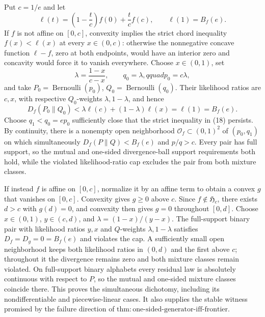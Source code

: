 Put \(c=1/e\) and let
\[
 \ell(t)=\left(1-\frac tc\right)f(0)+\frac tc f(c),
 \qquad \ell(1)=B_f(e).
\]
If \(f\) is not affine on \([0,c]\), convexity implies the strict chord inequality \(f(x)<\ell(x)\) at every \(x\in(0,c)\): otherwise the nonnegative concave function \(\ell-f\), zero at both endpoints, would have an interior zero and concavity would force it to vanish everywhere.  Choose \(x\in(0,1)\), set
\[
 \lambda=\frac{1-x}{c-x},\qquad q_0=\lambda,qquad p_0=c\lambda,
\]
and take \(P_0=\operatorname{Bernoulli}(p_0)\), \(Q_0=\operatorname{Bernoulli}(q_0)\).  Their likelihood ratios are \(c,x\), with respective \(Q_0\)-weights \(\lambda,1-\lambda\), and hence
\[
 D_f(P_0\|Q_0)<\lambda\ell(c)+(1-\lambda)\ell(x)=\ell(1)=B_f(e). \tag{18}
\]
Choose \(q_1<q_0=ep_0\) sufficiently close that the strict inequality in (18) persists.  By continuity, there is a nonempty open neighborhood \(\mathcal O_f\subset(0,1)^2\) of \((p_0,q_1)\) on which simultaneously \(D_f(P\|Q)<B_f(e)\) and \(p/q>c\).  Every pair has full support, so the mutual and one-sided divergence-ball support requirements both hold, while the violated likelihood-ratio cap excludes the pair from both mixture classes.

If instead \(f\) is affine on \([0,c]\), normalize it by an affine term to obtain a convex \(g\) that vanishes on \([0,c]\).  Convexity gives \(g\ge0\) above \(c\).  Since \(f\notin\mathfrak H_c\), there exists \(d>c\) with \(g(d)=0\), and convexity then gives \(g=0\) throughout \([0,d]\).  Choose \(x\in(0,1)\), \(y\in(c,d)\), and \(\lambda=(1-x)/(y-x)\).  The full-support binary pair with likelihood ratios \(y,x\) and \(Q\)-weights \(\lambda,1-\lambda\) satisfies \(D_f=D_g=0=B_f(e)\) and violates the cap.  A sufficiently small open neighborhood keeps both likelihood ratios in \((0,d)\) and the first above \(c\); throughout it the divergence remains zero and both mixture classes remain violated.  On full-support binary alphabets every residual law is absolutely continuous with respect to \(P\), so the mutual and one-sided mixture classes coincide there.  This proves the simultaneous dichotomy, including its nondifferentiable and piecewise-linear cases.  It also supplies the stable witness promised by the failure direction of \(\mathrm{thm:one\text{-}sided\text{-}generator\text{-}iff\text{-}frontier}\).
